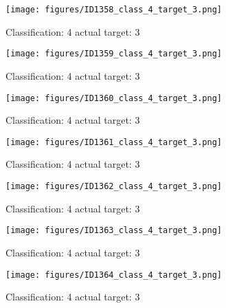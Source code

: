 \begin{figure}[h!]
\begin{center}
\texttt{[image: figures/ID1358\_class\_4\_target\_3.png]}
\end{center}
\caption{ Classification: 4 actual target: 3}
\label{fig:ID1358_class_4_target_3}
\end{figure}
\begin{figure}[h!]
\begin{center}
\texttt{[image: figures/ID1359\_class\_4\_target\_3.png]}
\end{center}
\caption{ Classification: 4 actual target: 3}
\label{fig:ID1359_class_4_target_3}
\end{figure}
\begin{figure}[h!]
\begin{center}
\texttt{[image: figures/ID1360\_class\_4\_target\_3.png]}
\end{center}
\caption{ Classification: 4 actual target: 3}
\label{fig:ID1360_class_4_target_3}
\end{figure}
\begin{figure}[h!]
\begin{center}
\texttt{[image: figures/ID1361\_class\_4\_target\_3.png]}
\end{center}
\caption{ Classification: 4 actual target: 3}
\label{fig:ID1361_class_4_target_3}
\end{figure}
\begin{figure}[h!]
\begin{center}
\texttt{[image: figures/ID1362\_class\_4\_target\_3.png]}
\end{center}
\caption{ Classification: 4 actual target: 3}
\label{fig:ID1362_class_4_target_3}
\end{figure}
\begin{figure}[h!]
\begin{center}
\texttt{[image: figures/ID1363\_class\_4\_target\_3.png]}
\end{center}
\caption{ Classification: 4 actual target: 3}
\label{fig:ID1363_class_4_target_3}
\end{figure}
\begin{figure}[h!]
\begin{center}
\texttt{[image: figures/ID1364\_class\_4\_target\_3.png]}
\end{center}
\caption{ Classification: 4 actual target: 3}
\label{fig:ID1364_class_4_target_3}
\end{figure}
